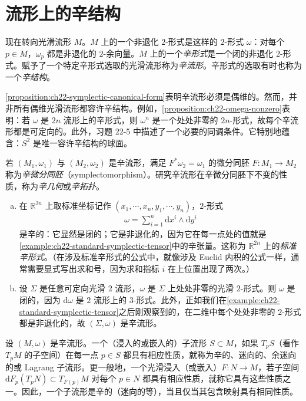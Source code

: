 \documentclass[../../main.tex]{subfiles}
\begin{document}
\section{流形上的辛结构}\label{section:ch22-symplectic-structures-on-manifolds}

现在转向光滑流形 $M$。$M$ 上的一个非退化 $2$-形式是这样的 $2$-形式 $\omega$：对每个 $p\in M$，$\omega_p$ 都是非退化的 $2$-余向量。$M$ 上的一个\emph{辛形式}是一个闭的非退化 $2$-形式。赋予了一个特定辛形式选取的光滑流形称为\emph{辛流形}。辛形式的选取有时也称为一个\emph{辛结构}。

\cref{proposition:ch22-symplectic-canonical-form}表明辛流形必须是偶维的。然而，并非所有偶维光滑流形都容许辛结构。例如，\cref{proposition:ch22-omega-nonzero}表明：若 $\omega$ 是 $2n$ 流形上的辛形式，则 $\omega^n$ 是一个处处非零的 $2n$-形式，故每个辛流形都是可定向的。此外，习题 22-5 中描述了一个必要的同调条件。它特别地蕴含：$S^2$ 是唯一容许辛结构的球面。

若 $(M_1,\omega_1)$ 与 $(M_2,\omega_2)$ 是辛流形，满足 $F^*\omega_2=\omega_1$ 的微分同胚 $F:M_1\to M_2$ 称为\emph{辛微分同胚}（symplectomorphism）。研究辛流形在辛微分同胚下不变的性质，称为\emph{辛几何}或\emph{辛拓扑}。

\begin{example}[辛流形]\label{example:ch22-symplectic-manifolds}
\begin{enumerate}[(a)]
\item 在 $\mathbb{R}^{2n}$ 上取标准坐标记作 $(x_1,\cdots ,x_n,y_1,\cdots ,y_n)$，$2$-形式
\begin{align}
\omega=\sum_{i=1}^n \mathrm{d}x^i\wedge\mathrm{d}y^i
\end{align}
是辛的：它显然是闭的；它是非退化的，因为它在每一点处的值就是\cref{example:ch22-standard-symplectic-tensor}中的辛张量。这称为 $\mathbb{R}^{2n}$ 上的\emph{标准辛形式}。（在涉及标准辛形式的公式中，就像涉及 Euclid 内积的公式一样，通常需要显式写出求和号，因为求和指标 $i$ 在上位置出现了两次。）
\item 设 $\Sigma$ 是任意可定向光滑 $2$ 流形，$\omega$ 是 $\Sigma$ 上处处非零的光滑 $2$-形式。则 $\omega$ 是闭的，因为 $\mathrm{d}\omega$ 是 $2$ 流形上的 $3$-形式。此外，正如我们在\cref{example:ch22-standard-symplectic-tensor}之后刚观察到的，在二维中每个处处非零的 $2$-形式都是非退化的，故 $(\Sigma,\omega)$ 是辛流形。
\end{enumerate}
\end{example}

设 $(M,\omega)$ 是辛流形。一个（浸入的或嵌入的）子流形 $S\subset M$，如果 $T_pS$（看作 $T_pM$ 的子空间）在每一点 $p\in S$ 都具有相应性质，就称为辛的、迷向的、余迷向的或 Lagrang 子流形。更一般地，一个光滑浸入（或嵌入）$F:N\to M$，若子空间 $\mathrm{d}F_p(T_pN)\subset T_{F(p)}M$ 对每个 $p\in N$ 都具有相应性质，就称它具有这些性质之一。因此，一个子流形是辛的（迷向的等），当且仅当其包含映射具有相同性质。
\end{document}
